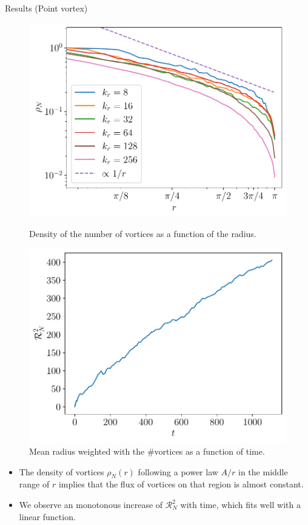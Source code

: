 \documentclass{beamer} %
\begin{document}
\begin{frame}{Results (Point vortex)}
	\begin{figure}[ht]
		\centering
		\begin{minipage}[t]{0.44\textwidth}
			\centering
			\includegraphics[width=\textwidth]{../images/NumVortices.pdf}
			\caption{Density of the number of vortices as a function of the radius.}
		\end{minipage}\hspace{0.04\textwidth}
		\begin{minipage}[t]{0.44\textwidth}
			\centering
			\includegraphics[width=\textwidth]{../images/NumVorticesMeanRadius.pdf}
			\caption{Mean radius weighted with the \#vortices as a function of time.}		\end{minipage}
	\end{figure}
	\vspace{-0.2cm}
	\begin{itemize}
		\item The density of vortices $\rho_N(r)$ following a power law $A/r$ in the middle range of $r$ implies that the flux of vortices on that region is almost constant.
		\item We observe an monotonous increase of $\mathcal{R}_N^2$ with time, which fits well with a linear function.
	\end{itemize}
\end{frame}
\end{document}

